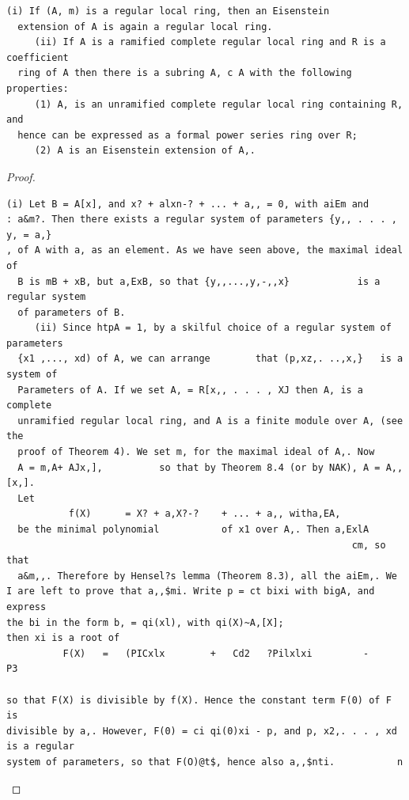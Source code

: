 \begin{theorem}\label{mcrt-auto-theorem-29-8}\uses{}
\begin{verbatim}
(i) If (A, m) is a regular local ring, then an Eisenstein
  extension of A is again a regular local ring.
     (ii) If A is a ramified complete regular local ring and R is a coefficient
  ring of A then there is a subring A, c A with the following properties:
     (1) A, is an unramified complete regular local ring containing R, and
  hence can be expressed as a formal power series ring over R;
     (2) A is an Eisenstein extension of A,.
\end{verbatim}
\end{theorem}
\begin{proof}
\begin{verbatim}
(i) Let B = A[x], and x? + alxn-? + ... + a,, = 0, with aiEm and
: a&m?. Then there exists a regular system of parameters {y,, . . . , y, = a,}
, of A with a, as an element. As we have seen above, the maximal ideal of
  B is mB + xB, but a,ExB, so that {y,,...,y,-,,x}            is a regular system
  of parameters of B.
     (ii) Since htpA = 1, by a skilful choice of a regular system of parameters
  {x1 ,..., xd) of A, we can arrange        that (p,xz,. ..,x,}   is a system of
  Parameters of A. If we set A, = R[x,, . . . , XJ then A, is a complete
  unramified regular local ring, and A is a finite module over A, (see the
  proof of Theorem 4). We set m, for the maximal ideal of A,. Now
  A = m,A+ AJx,],          so that by Theorem 8.4 (or by NAK), A = A,,[x,].
  Let
           f(X)      = X? + a,X?-?    + ... + a,, witha,EA,
  be the minimal polynomial           of x1 over A,. Then a,ExlA
                                                             cm, so that
  a&m,,. Therefore by Hensel?s lemma (Theorem 8.3), all the aiEm,. We
I are left to prove that a,,$mi. Write p = ct bixi with bigA, and express
the bi in the form b, = qi(xl), with qi(X)~A,[X];                             then xi is a root of
          F(X)   =   (PICxlx        +   Cd2   ?Pilxlxi         -     P3

so that F(X) is divisible by f(X). Hence the constant term F(0) of F is
divisible by a,. However, F(0) = ci qi(0)xi - p, and p, x2,. . . , xd is a regular
system of parameters, so that F(O)@t$, hence also a,,$nti.           n
\end{verbatim}
\end{proof}


